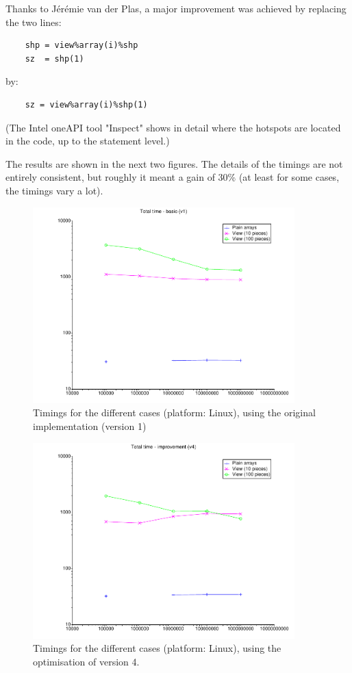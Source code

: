 \documentclass[onecolumn]{article}
\begin{document}
Thanks to J\'er\'emie van der Plas, a major improvement was achieved by replacing the two lines:
\begin{verbatim}
    shp = view%array(i)%shp
    sz  = shp(1)
\end{verbatim}
\noindent by:
\begin{verbatim}
    sz = view%array(i)%shp(1)
\end{verbatim}

(The Intel oneAPI tool "Inspect" shows in detail where the hotspots are located in the code, up to the
statement level.)

The results are shown in the next two figures. The details of the timings are not entirely consistent, but
roughly it meant a gain of 30\% (at least for some cases, the timings vary a lot).

\begin{figure}
\includegraphics[width=0.9\textwidth]{total_v1.pdf}
\caption{Timings for the different cases (platform: Linux), using the original implementation (version 1)}
\end{figure}

\begin{figure}
\includegraphics[width=0.9\textwidth]{total_v4.pdf}
\caption{Timings for the different cases (platform: Linux), using the optimisation of version 4.}
\end{figure}
\end{document}
